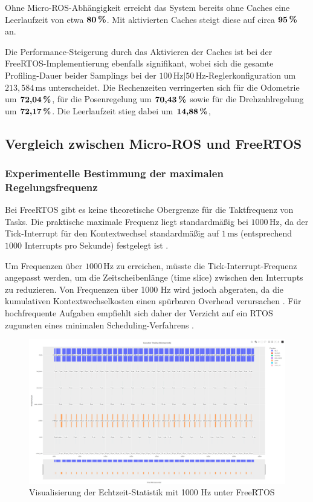 Ohne Micro-ROS-Abhängigkeit erreicht das System bereits ohne Caches eine
Leerlaufzeit von etwa $\textbf{80\,\%}$. Mit aktivierten Caches steigt diese auf
circa $\textbf{95\,\%}$ an.


Die Performance-Steigerung durch das Aktivieren der Caches ist bei der
FreeRTOS-Implementierung ebenfalls signifikant, wobei sich die gesamte
Profiling-Dauer beider Samplings bei der
$100\,\text{Hz}|50\,\text{Hz}$-Reglerkonfiguration um $213,584\,\text{ms}$
unterscheidet. Die Rechenzeiten verringerten sich für die Odometrie um
$\textbf{72,04\,\%}$, für die Posenregelung um $\textbf{70,43\,\%}$ sowie für
die Drehzahlregelung um $\textbf{72,17\,\%}$. Die Leerlaufzeit stieg dabei um
$\textbf{14,88\,\%}$, 

\subsection{Vergleich zwischen Micro-ROS und FreeRTOS}

\subsubsection{Experimentelle Bestimmung der maximalen Regelungsfrequenz}

Bei FreeRTOS gibt es keine theoretische Obergrenze für die Taktfrequenz von
Tasks. Die praktische maximale Frequenz liegt standardmäßig bei
$1000\,\text{Hz}$, da der Tick-Interrupt für den Kontextwechsel standardmäßig
auf $1\,\text{ms}$ (entsprechend $1000$ Interrupts pro Sekunde) festgelegt ist
\cite{FreertosTasks}.

Um Frequenzen über $1000\,\text{Hz}$ zu erreichen, müsste die
Tick-Interrupt-Frequenz angepasst werden, um die Zeitscheibenlänge (time slice)
zwischen den Interrupts zu reduzieren. Von Frequenzen über 1000 Hz wird jedoch
abgeraten, da die kumulativen Kontextwechselkosten einen spürbaren Overhead
verursachen \cite{FreertosTickRate2010}. Für hochfrequente Aufgaben empfiehlt
sich daher der Verzicht auf ein RTOS zugunsten eines minimalen
Scheduling-Verfahrens \cite{FreertosForumHF2019}.

\begin{figure}[H]
    \centering
    \includegraphics[width=1\textwidth]{assets/freertos_profiling_1000hz}
    \caption{Visualisierung der Echtzeit-Statistik mit 1000 Hz unter FreeRTOS}
\end{figure}

